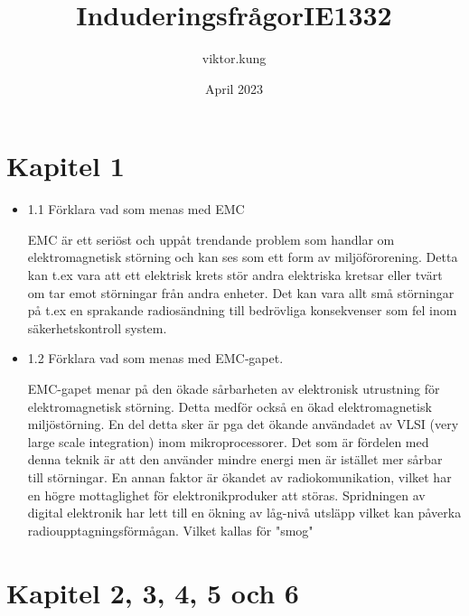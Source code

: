 \documentclass{article}
\title{InduderingsfrågorIE1332}
\author{viktor.kung }
\date{April 2023}
\begin{document}
\maketitle

\section{Kapitel 1}

\begin{itemize}
    \item 1.1 Förklara vad som menas med EMC

	EMC är ett seriöst och uppåt trendande problem som handlar om
	elektromagnetisk störning och kan ses som ett form av miljöförorening.
	Detta kan t.ex vara att ett elektrisk krets stör andra elektriska
	kretsar eller tvärt om tar emot störningar från andra enheter. Det kan
	vara allt små störningar på t.ex en sprakande radiosändning till
	bedrövliga konsekvenser som fel inom säkerhetskontroll system.

\item 1.2 Förklara vad som menas med EMC‐gapet.

	EMC-gapet menar på den ökade sårbarheten av elektronisk utrustning för
	elektromagnetisk störning. Detta medför också en ökad elektromagnetisk
	miljöstörning. En del detta sker är pga det ökande användadet av VLSI
	(very large scale integration) inom mikroprocessorer. Det som är
	fördelen med denna teknik är att den använder mindre energi men är
	istället mer sårbar till störningar. En annan faktor är ökandet av
	radiokomunikation, vilket har en högre mottaglighet för
	elektronikproduker att störas. Spridningen av digital elektronik har
	lett till en ökning av låg-nivå utsläpp vilket kan påverka
	radioupptagningsförmågan. Vilket kallas för "smog"

\end{itemize}

\section{Kapitel 2, 3, 4, 5 och 6}
\end{document}
